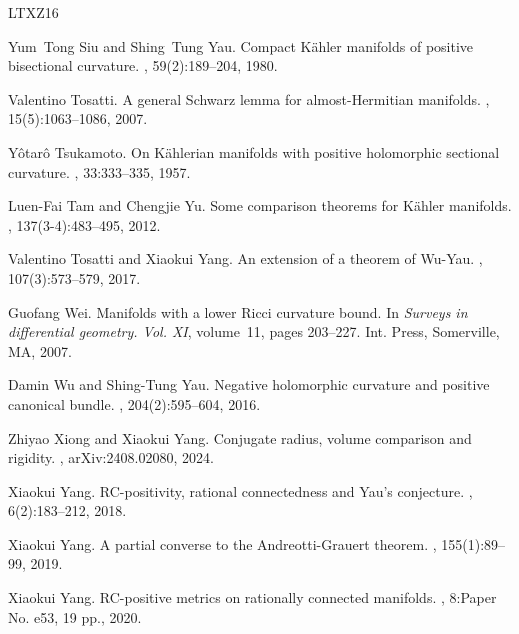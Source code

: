 \documentclass[12pt]{amsart}
\theoremstyle{plain}
\theoremstyle{definition}
\renewcommand{\>}{\rightarrow}
\numberwithin{equation}{section} %
\begin{document}
\begin{thebibliography}{LTXZ16}
	
	Yum~Tong Siu and Shing~Tung Yau.
	\newblock Compact {K}\"ahler manifolds of positive bisectional curvature.
	, 59(2):189--204, 1980.
	
	
	Valentino Tosatti.
	\newblock A general {S}chwarz lemma for almost-{H}ermitian manifolds.
	, 15(5):1063--1086, 2007.
	
	Y\^otar\^o Tsukamoto.
	\newblock On {K}\"ahlerian manifolds with positive holomorphic sectional curvature.
	, 33:333--335, 1957.
	
	Luen-Fai Tam and Chengjie Yu.
	\newblock Some comparison theorems for {K}\"ahler manifolds.
	, 137(3-4):483--495, 2012.
	
	
	Valentino Tosatti and Xiaokui Yang.
	\newblock An extension of a theorem of {W}u-{Y}au.
	, 107(3):573--579, 2017.
	
	Guofang Wei.
	\newblock Manifolds with a lower {R}icci curvature bound.
	\newblock In {\em Surveys in differential geometry. {V}ol. {XI}}, volume~11, pages 203--227. Int. Press, Somerville, MA, 2007.
	
	Damin Wu and Shing-Tung Yau.
	\newblock Negative holomorphic curvature and positive canonical bundle.
	, 204(2):595--604, 2016.
	
	Zhiyao Xiong and Xiaokui Yang.
	\newblock Conjugate radius, volume comparison and rigidity.
	, arXiv:2408.02080, 2024.
	
	
	
	Xiaokui Yang.
	\newblock R{C}-positivity, rational connectedness and {Y}au's conjecture.
	, 6(2):183--212, 2018.
	
	Xiaokui Yang.
	\newblock A partial converse to the Andreotti-Grauert theorem.
	, 155(1):89--99, 2019.
	
	
	Xiaokui Yang.
	\newblock RC-positive metrics on rationally connected manifolds.
	, 8:Paper No. e53, 19 pp., 2020.
	

\end{thebibliography}
\end{document}
